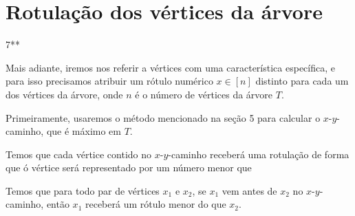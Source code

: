 \documentclass[a4paper,12pt]{article}
\begin{document}
	\section {Rotulação dos vértices da árvore} 7**

		Mais adiante, iremos nos referir a vértices com uma característica 
		específica, e para isso precisamos atribuir um rótulo numérico $x\in [n]$ 
		distinto para cada um dos vértices da árvore, onde $n$ é o número de 
		vértices da árvore $T$.

		Primeiramente, usaremos o método mencionado na seção 5 para
		calcular o $x$-$y$-caminho, que é máximo em $T$.

		Temos que cada vértice contido no $x$-$y$-caminho receberá uma 
		rotulação de forma que ó vértice será representado por um número
		menor que 

		Temos que para todo par de vértices $x_1$ e $x_2$, se $x_1$ vem antes 
		de $x_2$ no $x$-$y$-caminho, então $x_1$ receberá um rótulo menor
		do que $x_2$.

	
	
\end{document}
